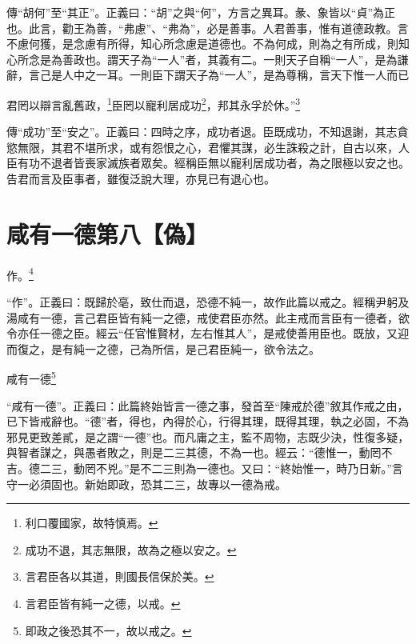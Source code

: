 {\noindent\zhuan{}\fzbyks 傳“胡何”至“其正”。正義曰：“胡”之與“何”，方言之異耳。彖、象皆以“貞”為正也。此言，勸王為善，“弗慮”、“弗為”，必是善事。人君善事，惟有道德政教。言不慮何獲，是念慮有所得，知心所念慮是道德也。不為何成，則為之有所成，則知心所念是為善政也。謂天子為“一人”者，其義有二。一則天子自稱“一人”，是為謙辭，言己是人中之一耳。一則臣下謂天子為“一人”，是為尊稱，言天下惟一人而已 \par}

君罔以辯言亂舊政，\footnote{利口覆國家，故特慎焉。}臣罔以寵利居成功\footnote{成功不退，其志無限，故為之極以安之。}，邦其永孚於休。”\footnote{言君臣各以其道，則國長信保於美。}

{\noindent\zhuan{}\fzbyks 傳“成功”至“安之”。正義曰：四時之序，成功者退。臣既成功，不知退謝，其志貪慾無限，其君不堪所求，或有怨恨之心，君懼其謀，必生誅殺之計，自古以來，人臣有功不退者皆喪家滅族者眾矣。經稱臣無以寵利居成功者，為之限極以安之也。告君而言及臣事者，雖復泛說大理，亦見已有退心也。 \par}

\section{咸有一德第八【偽】}


作。\footnote{言君臣皆有純一之德，以戒。}

{\noindent\shu{}\fzkt “作”。正義曰：既歸於亳，致仕而退，恐德不純一，故作此篇以戒之。經稱尹躬及湯咸有一德，言己君臣皆有純一之德，戒使君臣亦然。此主戒而言臣有一德者，欲令亦任一德之臣。經云“任官惟賢材，左右惟其人”，是戒使善用臣也。既放，又迎而復之，是有純一之德，己為所信，是己君臣純一，欲令法之。 \par}

咸有一德\footnote{即政之後恐其不一，故以戒之。}

{\noindent\shu{}\fzkt “咸有一德”。正義曰：此篇終始皆言一德之事，發首至“陳戒於德”敘其作戒之由，已下皆戒辭也。“德”者，得也，內得於心，行得其理，既得其理，執之必固，不為邪見更致差貳，是之謂“一德”也。而凡庸之主，監不周物，志既少決，性復多疑，與智者謀之，與愚者敗之，則是二三其德，不為一也。經云：“德惟一，動罔不吉。德二三，動罔不兇。”是不二三則為一德也。又曰：“終始惟一，時乃日新。”言守一必須固也。新始即政，恐其二三，故專以一德為戒。 \par}


